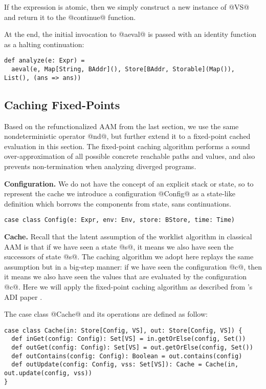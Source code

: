 \documentclass[acmsmall,review,anonymous]{acmart}\settopmatter{printfolios=true,printccs=false,printacmref=false}
\begin{document}
If the expression is atomic, then we simply construct a new instance of
@VS@ and return it to the @continue@ function.

At the end, the initial invocation to @aeval@ is passed with an identity
function as a halting continuation:
\begin{lstlisting}
def analyze(e: Expr) =
  aeval(e, Map[String, BAddr](), Store[BAddr, Storable](Map()), List(), (ans => ans))
\end{lstlisting}

\subsection{Caching Fixed-Points}

Based on the refunctionalized AAM from the last section, we use the same nondeterministic
operator @nd@, but further extend it to a fixed-point cached evaluation in this section.
The fixed-point caching algorithm performs a sound over-approximation of all possible
concrete reachable paths and values, and also prevents non-termination when analyzing diverged programs.

\textbf{Configuration.}
We do not have the concept of an explicit stack or state,
so to represent the cache we introduce a configuration @Config@ as
a state-like definition which borrows the components from state, sans continuations.
\begin{lstlisting}
case class Config(e: Expr, env: Env, store: BStore, time: Time)
\end{lstlisting}

\textbf{Cache.}
Recall that the latent assumption of the worklist algorithm in classical AAM
is that if we have seen a state @s@, it means we also have seen the successors
of state @s@.
The caching algorithm we adopt here replays the same assumption but in a big-step
manner: if we have seen the configuration @c@, then it means we also have seen
the values that are evaluated by the configuration @c@.
Here we will apply the fixed-point caching algorithm as described from
\citeauthor{darais2017abstracting}'s ADI paper \cite{darais2017abstracting}.

The case class @Cache@ and its operations are defined as follow:

\begin{lstlisting}
case class Cache(in: Store[Config, VS], out: Store[Config, VS]) {
  def inGet(config: Config): Set[VS] = in.getOrElse(config, Set())
  def outGet(config: Config): Set[VS] = out.getOrElse(config, Set())
  def outContains(config: Config): Boolean = out.contains(config)
  def outUpdate(config: Config, vss: Set[VS]): Cache = Cache(in, out.update(config, vss))
}
\end{lstlisting}
\end{document}
